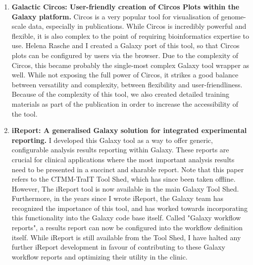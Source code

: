 \begin{enumerate}[label=\ref{chapter:general}.\arabic*]
\item \textbf{Galactic Circos: User-friendly creation of Circos Plots within the Galaxy platform.} Circos is a very popular tool for visualisation of genome-scale data, especially in publications. While Circos is incredibly powerful and flexible, it is also complex to the point of requiring bioinformatics expertise to use. Helena Rasche and I created a Galaxy port of this tool, so that Circos plots can be configured by users via the browser. Due to the complexity of Circos, this became probably the single-most complex Galaxy tool wrapper as well. While not exposing the full power of Circos, it strikes a good balance between versatility and complexity, between flexibility and user-friendliness. Because of the complexity of this tool, we also created detailed training materials as part of the publication in order to increase the accessibility of the tool.


\item \textbf{iReport: A generalised Galaxy solution for integrated experimental reporting.} I developed this Galaxy tool as a way to offer generic, configurable analysis results reporting within Galaxy. These reports are crucial for clinical applications where the most important analysis results need to be presented in a succinct and sharable report. Note that this paper refers to the CTMM-TraIT Tool Shed, which has since been taken offline. However, The iReport tool is now available in the main Galaxy Tool Shed. Furthermore, in the years since I wrote iReport, the Galaxy team has recognized the importance of this tool, and has worked towards incorporating this functionality into the Galaxy code base itself. Called "Galaxy workflow reports", a results report can now be configured into the workflow definition itself. While iReport is still available from the Tool Shed, I have halted any further iReport development in favour of contributing to these Galaxy workflow reports and optimizing their utility in the clinic.
\end{enumerate}



